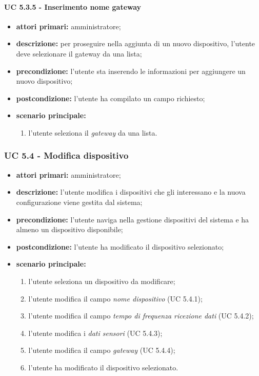 				\paragraph{UC 5.3.5 - Inserimento nome gateway}
				\begin{itemize}
					\item \textbf{attori primari:} amministratore;
					\item \textbf{descrizione:} per proseguire nella aggiunta di un nuovo dispositivo, l'utente deve selezionare il gateway da una lista;
					\item \textbf{precondizione:} l'utente sta inserendo le informazioni per aggiungere un nuovo dispositivo;
					\item \textbf{postcondizione:} l'utente ha compilato un campo richiesto;
					\item \textbf{scenario principale:}
					\begin{enumerate}
						\item{l'utente seleziona il \textit{gateway} da una lista.}
					\end{enumerate}
				\end{itemize}

			\subsubsection{UC 5.4 - Modifica dispositivo}
			\begin{itemize}
				\item \textbf{attori primari:} amministratore;
				\item \textbf{descrizione:} l'utente modifica i dispositivi che gli interessano e la nuova configurazione viene gestita dal sistema;
				\item \textbf{precondizione:} l'utente naviga nella gestione dispositivi del sistema e ha almeno un dispositivo disponibile;
				\item \textbf{postcondizione:} l'utente ha modificato il dispositivo selezionato;
				\item \textbf{scenario principale:}
				\begin{enumerate}
					\item{l'utente seleziona un dispositivo da modificare;}
					\item{l'utente modifica il campo \textit{nome dispositivo} (UC 5.4.1);}
					\item{l'utente modifica il campo \textit{tempo di frequenza ricezione dati} (UC 5.4.2);}
					\item{l'utente modifica i \textit{dati sensori} (UC 5.4.3);}
					\item{l'utente modifica il campo \textit{gateway} (UC 5.4.4);}
					\item{l'utente ha modificato il dispositivo selezionato.}
				\end{enumerate}
			\end{itemize}

